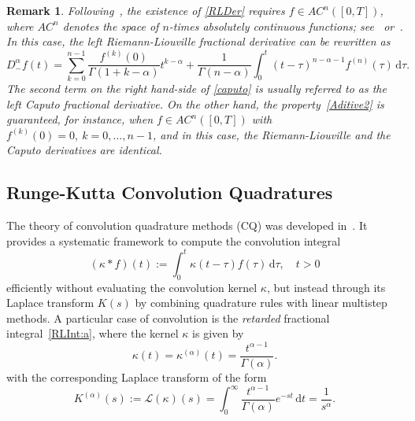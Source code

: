 \documentclass[a4paper,10pt,reqno]{amsart}
\newtheorem{remark}{Remark}[section]
\theoremstyle{definition}
\newcommand{\dd}{\mathrm{d}}
\begin{document}
\begin{remark}
Following~\cite[Lemma 2.2]{TheBook2}, the existence of \eqref{RLDer} requires $f\in AC^{n}([0,T])$, where $AC^{n}$ denotes the space of $n$-times absolutely continuous functions; see~\cite[Equation (1.1.7)]{TheBook2} or~\cite[Definition 1.3]{TheBook}. In this case, the left Riemann-Liouville fractional derivative can be rewritten  as
\begin{equation}\label{caputo}
 D^{\alpha}_{-}f(t)=\sum_{k=0}^{n-1}\frac{f^{(k)}(0)}{\Gamma(1+k-\alpha)}t^{k-\alpha}+\frac{1}{\Gamma(n-\alpha)}\int_0^t(t-\tau)^{n-\alpha-1}f^{(n)}(\tau)\,\dd\tau. 
\end{equation}
The second term on the right hand-side of \eqref{caputo} is usually referred to as the \textnormal{left Caputo fractional derivative}. On the other hand, the property~\eqref{Aditive2} is guaranteed, for instance, when $f\in AC^{n}([0,T])$ with $f^{(k)}(0) = 0,\ k = 0, \ldots , n - 1$, and in this case, the Riemann-Liouville and the Caputo derivatives are identical.
\end{remark}


\subsection{Runge-Kutta Convolution Quadratures}\label{sec:RKCQ}
The theory of convolution quadrature methods (CQ) was developed in~\cite{Lubich1,Lubich2,Lubich3}. It provides a systematic framework to compute  the convolution integral 
\begin{equation}\label{ContConv}
\left(\kappa\ast f\right)(t):=\int_0^t\kappa(t-\tau)f(\tau)\,\dd\tau, \quad t>0
\end{equation}
efficiently without evaluating the convolution kernel $\kappa$, but instead through its Laplace transform $K(s)$ by combining quadrature rules with linear multistep methods. A particular case of convolution is the {\it retarded} fractional integral~\eqref{RLInt:a}, where the  kernel $\kappa$ is given by
\begin{equation}\label{ConvKer}
\kappa(t)=\kappa^{(\alpha)}(t)=\frac{t^{\alpha-1}}{\Gamma(\alpha)}.
\end{equation}
with the corresponding Laplace transform of the form
\begin{equation}\label{LaplaceTrans}
K^{(\alpha)}(s):=\mathscr{L}(\kappa)(s)=\int_0^{\infty}\frac{t^{\alpha-1}}{\Gamma(\alpha)}e^{-st}\, \dd t=\frac{1}{s^\alpha}.
\end{equation}
\end{document}
